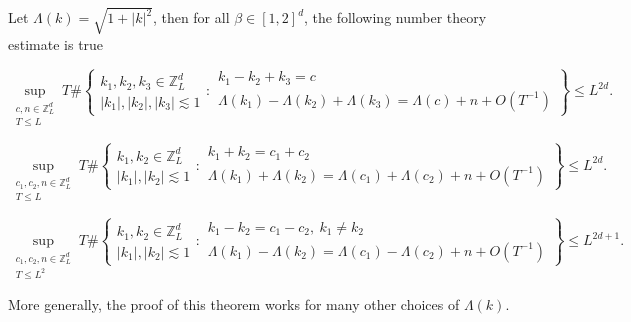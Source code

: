 \begin{thm}\label{th.numbertheory1}
Let $\Lambda(k)=\sqrt{1+|k|^2}$, then for all $\beta\in [1,2]^d$, the following number theory estimate is true

\begin{equation}\label{eq.numbertheory1}
    \sup_{\substack{c,n\in\mathbb{Z}_L^d\\T\le L}}
    T\#\left\{
        \begin{matrix}
            k_1,k_2,k_3\in\mathbb{Z}_L^d \\
            |k_1|,|k_2|,|k_3|\lesssim 1
        \end{matrix}
        :
        \begin{matrix}
            k_1-k_2+k_3=c \\
            \Lambda(k_1)-\Lambda(k_2)+\Lambda(k_3)=\Lambda(c)+n+O(T^{-1})
        \end{matrix}
    \right\}\le L^{2d}.
\end{equation}

\begin{equation}\label{eq.numbertheory1'}
    \sup_{\substack{c_1,c_2,n\in\mathbb{Z}_L^d\\T\le L}}
    T\#\left\{
        \begin{matrix}
            k_1,k_2\in\mathbb{Z}_L^d \\
            |k_1|, |k_2|\lesssim 1
        \end{matrix}
        :
        \begin{matrix}
            k_1+ k_2=c_1+ c_{2} \\
            \Lambda(k_1)+\Lambda(k_2)=\Lambda(c_1)+ \Lambda(c_2)+n+O(T^{-1})
        \end{matrix}
        \right\}\le L^{2d}.
\end{equation}

\begin{equation}\label{eq.numbertheory1''}
    \sup_{\substack{c_1,c_2,n\in\mathbb{Z}_L^d\\T\le L^2}}
    T\#\left\{
        \begin{matrix}
            k_1,k_2\in\mathbb{Z}_L^d \\
            |k_1|, |k_2|\lesssim 1
        \end{matrix}
        :
        \begin{matrix}
            k_1- k_2=c_1- c_{2},\ k_1\ne k_2 \\
            \Lambda(k_1)-\Lambda(k_2)=\Lambda(c_1)- \Lambda(c_2)+n+O(T^{-1})
        \end{matrix}
        \right\}\le L^{2d+1}.
\end{equation}

More generally, the proof of this theorem works for many other choices of $\Lambda(k)$.
\end{thm}


